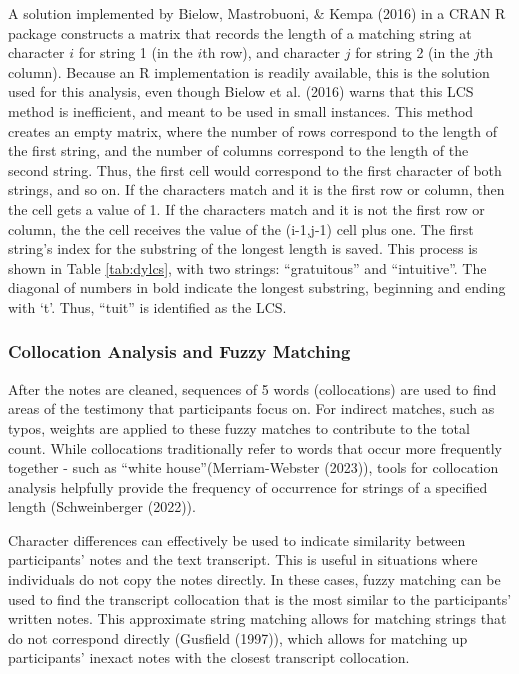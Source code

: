 \documentclass[print]{nuthesis}
\begin{document}
A solution implemented by Bielow, Mastrobuoni, \& Kempa (2016) in a CRAN R package constructs a matrix that records the length of a matching string at character \(i\) for string 1 (in the \(i\)th row), and character \(j\) for string 2 (in the \(j\)th column).
Because an R implementation is readily available, this is the solution used for this analysis, even though Bielow et al. (2016) warns that this LCS method is inefficient, and meant to be used in small instances.
This method creates an empty matrix, where the number of rows correspond to the length of the first string, and the number of columns correspond to the length of the second string.
Thus, the first cell would correspond to the first character of both strings, and so on.
If the characters match and it is the first row or column, then the cell gets a value of 1.
If the characters match and it is not the first row or column, the the cell receives the value of the (i-1,j-1) cell plus one.
The first string's index for the substring of the longest length is saved.
This process is shown in Table \ref{tab:dylcs}, with two strings: ``gratuitous'' and ``intuitive''.
The diagonal of numbers in bold indicate the longest substring, beginning and ending with `t'.
Thus, ``tuit'' is identified as the LCS.

\hypertarget{collocation-analysis-and-fuzzy-matching}{%
\subsubsection{Collocation Analysis and Fuzzy Matching}\label{collocation-analysis-and-fuzzy-matching}}

After the notes are cleaned, sequences of 5 words (collocations) are used to find areas of the testimony that participants focus on.
For indirect matches, such as typos, weights are applied to these fuzzy matches to contribute to the total count.
While collocations traditionally refer to words that occur more frequently together - such as ``white house''(Merriam-Webster (2023)), tools for collocation analysis helpfully provide the frequency of occurrence for strings of a specified length (Schweinberger (2022)).

Character differences can effectively be used to indicate similarity between participants' notes and the text transcript.
This is useful in situations where individuals do not copy the notes directly.
In these cases, fuzzy matching can be used to find the transcript collocation that is the most similar to the participants' written notes.
This approximate string matching allows for matching strings that do not correspond directly (Gusfield (1997)), which allows for matching up participants' inexact notes with the closest transcript collocation.
\end{document}
